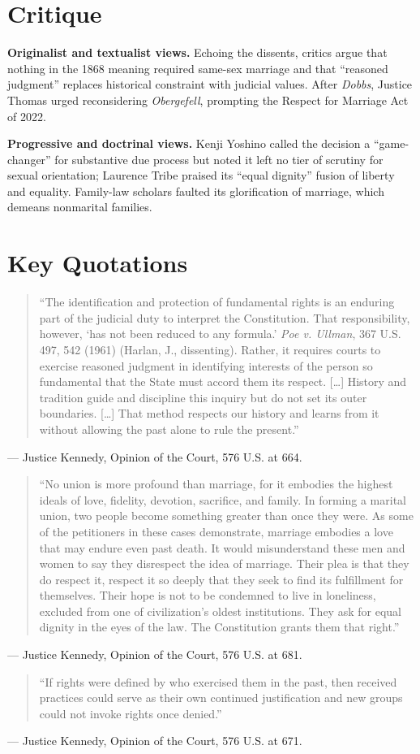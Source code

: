 \documentclass[12pt]{article}
\begin{document}
\section{Critique}

\textbf{Originalist and textualist views.} Echoing the dissents, critics argue that nothing in the 1868 meaning required same-sex marriage and that ``reasoned judgment'' replaces historical constraint with judicial values. After \textit{Dobbs}, Justice Thomas urged reconsidering \textit{Obergefell}, prompting the Respect for Marriage Act of 2022.

\textbf{Progressive and doctrinal views.} Kenji Yoshino called the decision a ``game-changer'' for substantive due process but noted it left no tier of scrutiny for sexual orientation; Laurence Tribe praised its ``equal dignity'' fusion of liberty and equality. Family-law scholars faulted its glorification of marriage, which demeans nonmarital families.

\section{Key Quotations}

\begin{quote}
``The identification and protection of fundamental rights is an enduring part of the judicial duty to interpret the Constitution. That responsibility, however, `has not been reduced to any formula.' \textit{Poe v. Ullman}, 367 U.S. 497, 542 (1961) (Harlan, J., dissenting). Rather, it requires courts to exercise reasoned judgment in identifying interests of the person so fundamental that the State must accord them its respect. [\dots] History and tradition guide and discipline this inquiry but do not set its outer boundaries. [\dots] That method respects our history and learns from it without allowing the past alone to rule the present.''
\end{quote}
\noindent --- Justice Kennedy, Opinion of the Court, 576 U.S. at 664.

\begin{quote}
``No union is more profound than marriage, for it embodies the highest ideals of love, fidelity, devotion, sacrifice, and family. In forming a marital union, two people become something greater than once they were. As some of the petitioners in these cases demonstrate, marriage embodies a love that may endure even past death. It would misunderstand these men and women to say they disrespect the idea of marriage. Their plea is that they do respect it, respect it so deeply that they seek to find its fulfillment for themselves. Their hope is not to be condemned to live in loneliness, excluded from one of civilization's oldest institutions. They ask for equal dignity in the eyes of the law. The Constitution grants them that right.''
\end{quote}
\noindent --- Justice Kennedy, Opinion of the Court, 576 U.S. at 681.

\begin{quote}
``If rights were defined by who exercised them in the past, then received practices could serve as their own continued justification and new groups could not invoke rights once denied.''
\end{quote}
\noindent --- Justice Kennedy, Opinion of the Court, 576 U.S. at 671.
\end{document}
